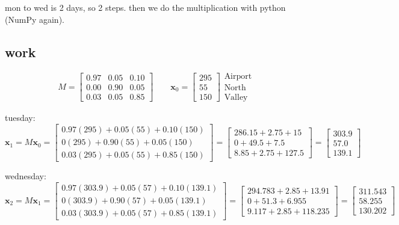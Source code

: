 \documentclass{article}
\begin{document}
mon to wed is 2 days, so 2 steps. then we do the multiplication with python (NumPy again).

\subsection*{work}

\[
M =
\begin{bmatrix}
0.97 & 0.05 & 0.10 \\
0.00 & 0.90 & 0.05 \\
0.03 & 0.05 & 0.85
\end{bmatrix}
\qquad
\mathbf{x}_0 =
\begin{bmatrix}
295 \\ 55 \\ 150
\end{bmatrix}
\begin{matrix}
\text{Airport} \\ \text{North} \\ \text{Valley}
\end{matrix}
\]

tuesday:
\[
\mathbf{x}_1 = M\mathbf{x}_0 =
\begin{bmatrix}
0.97(295) + 0.05(55) + 0.10(150) \\
0(295) + 0.90(55) + 0.05(150) \\
0.03(295) + 0.05(55) + 0.85(150)
\end{bmatrix}
=
\begin{bmatrix}
286.15 + 2.75 + 15 \\
0 + 49.5 + 7.5 \\
8.85 + 2.75 + 127.5
\end{bmatrix}
=
\begin{bmatrix}
303.9 \\ 57.0 \\ 139.1
\end{bmatrix}
\]

wednesday:
\[
\mathbf{x}_2 = M\mathbf{x}_1 =
\begin{bmatrix}
0.97(303.9) + 0.05(57) + 0.10(139.1) \\
0(303.9) + 0.90(57) + 0.05(139.1) \\
0.03(303.9) + 0.05(57) + 0.85(139.1)
\end{bmatrix}
=
\begin{bmatrix}
294.783 + 2.85 + 13.91 \\
0 + 51.3 + 6.955 \\
9.117 + 2.85 + 118.235
\end{bmatrix}
=
\begin{bmatrix}
311.543 \\ 58.255 \\ 130.202
\end{bmatrix}
\]
\end{document}
